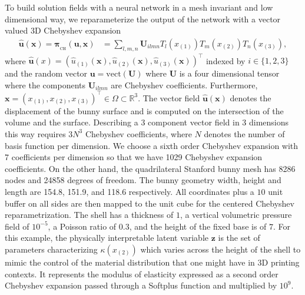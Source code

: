 \documentclass[11pt, fleqn]{article}
\def\z{{\mathbf z}}
\def\ubf{{\mathbf u}}
\def\bR{{\mathbb R}}
\def\bpi{{\boldsymbol \pi}}
\def\bpi{{\boldsymbol \pi}}
\def \bpiCH{{\bpi_{_\text{CH}}}}
\def \bsx {{\boldsymbol x}}
\def \bsu {{\boldsymbol u}}
\begin{document}
To build solution fields with a neural network in a mesh invariant and low dimensional way, we reparameterize the output of the network with a vector valued 3D Chebyshev expansion
\begin{align}
     \hat{\bsu}(\bsx) = \bpiCH(\ubf, \bsx) &= \sum_{l,m,n}\mathbf{U}_{ilmn}T_l(x_{(1)})T_m(x_{(2)})T_n(x_{(3)}),
\end{align}
where $\hat{\bsu}(x) = (\hat{u}_{(1)}(\bsx), \hat{u}_{(2)}(\bsx), \hat{u}_{(3)}(\bsx))^\top$ indexed by $i\in\{1,2,3\}$ and the random vector $\ubf = \text{vect}(\mathbf{U})$ where $\mathbf{U}$ is a four dimensional tensor where the components $\mathbf{U}_{ilmn}$ are Chebyshev coefficients. Furthermore, $\bsx = (x_{(1)},x_{(2)},x_{(3)})^\top \in \Omega \subset \bR^3$.
 The vector field $\hat{\bsu}(\bsx)$ denotes the displacement of the bunny surface and is computed on the intersection of the volume and the surface. Describing a 3 component vector field in 3 dimensions this way requires $3N^3$ Chebyshev coefficients, where $N$ denotes the number of basis function per dimension. We choose a sixth order Chebyshev expansion with 7 coefficients per dimension so that we have 1029 Chebyshev expansion coefficients. On the other hand, the quadrilateral Stanford bunny mesh has 8286 nodes and 24858 degrees of freedom. The bunny geometry width, height and length are 154.8, 151.9, and 118.6 respectively. All coordinates plus a $10$ unit buffer on all sides are then mapped to the unit cube for the centered Chebyshev reparametrization. The shell has a thickness of $1$, a vertical volumetric pressure field of $10^{-5}$, a Poisson ratio of 0.3, and the height of the fixed base is of $7$. For this example, the physically interpretable latent variable $\z$ is the set of parameters characterizing $\kappa(x_{(2)})$ which varies across the height of the shell to mimic the control of the material distribution that one might have in 3D printing contexts. It represents the modulus of elasticity expressed as a second order Chebyshev expansion passed through a Softplus function and multiplied by $10^9$. 
\end{document}

